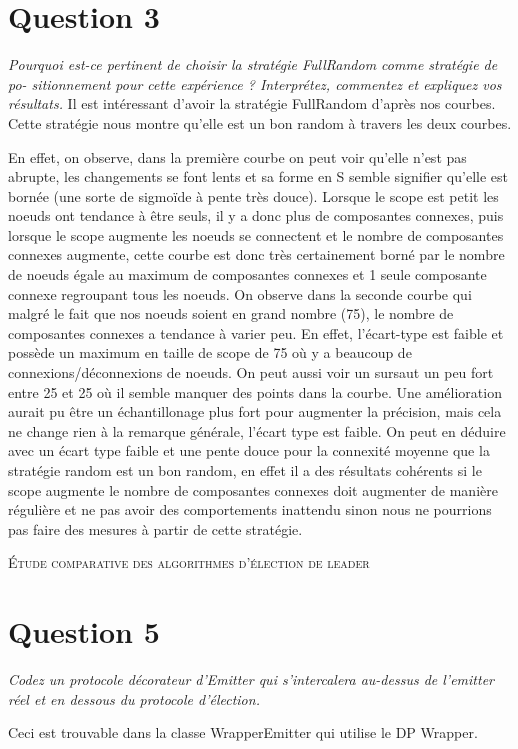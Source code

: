 \documentclass[11pt,a4paper,sans]{report}
\begin{document}
	\section{Question 3}
	\textit{Pourquoi est-ce pertinent de choisir la stratégie FullRandom comme stratégie de po- sitionnement pour cette expérience ?  Interprétez, commentez et expliquez vos résultats.}
	Il est intéressant d'avoir la stratégie FullRandom d'après nos courbes. Cette stratégie nous montre qu'elle est un bon random à travers les deux courbes.
	
	En effet, on observe, dans la première courbe on peut voir qu'elle n'est pas abrupte, les changements se font lents et sa forme en S semble signifier qu'elle est bornée (une sorte de sigmoïde à pente très douce). Lorsque le scope est petit les noeuds ont tendance à être seuls, il y a donc plus de composantes connexes, puis lorsque le scope augmente les noeuds se connectent et le nombre de composantes connexes augmente, cette courbe est donc très certainement borné par le nombre de noeuds égale au maximum de composantes connexes et 1 seule composante connexe regroupant tous les noeuds.
	On observe dans la seconde courbe qui malgré le fait que nos noeuds soient en grand nombre (75), le nombre de composantes connexes a tendance à varier peu. En effet, l'écart-type est faible et possède un maximum en taille de scope de 75 où y a beaucoup de connexions/déconnexions de noeuds. On peut aussi voir un sursaut un peu fort entre 25 et 25 où il semble manquer des points dans la courbe. Une amélioration aurait pu être un échantillonage plus fort pour augmenter la précision, mais cela ne change rien à la remarque générale, l'écart type est faible.
	On peut en déduire avec un écart type faible et une pente douce pour la connexité moyenne que la stratégie random est un bon random, en effet il a des résultats cohérents si le scope augmente le nombre de composantes connexes doit augmenter de manière régulière et ne pas avoir des comportements inattendu sinon nous ne pourrions pas faire des mesures à partir de cette stratégie.

	\newpage
	\begin{center}
		\textsc{\large Étude comparative des algorithmes d’élection de leader}
	\end{center}
	\section{Question 5}
	\textit{Codez un protocole décorateur d’Emitter qui s’intercalera au-dessus de l’emitter réel et en dessous du protocole d’élection.}
	\par Ceci est trouvable dans la classe WrapperEmitter qui utilise le DP Wrapper.
\end{document}
